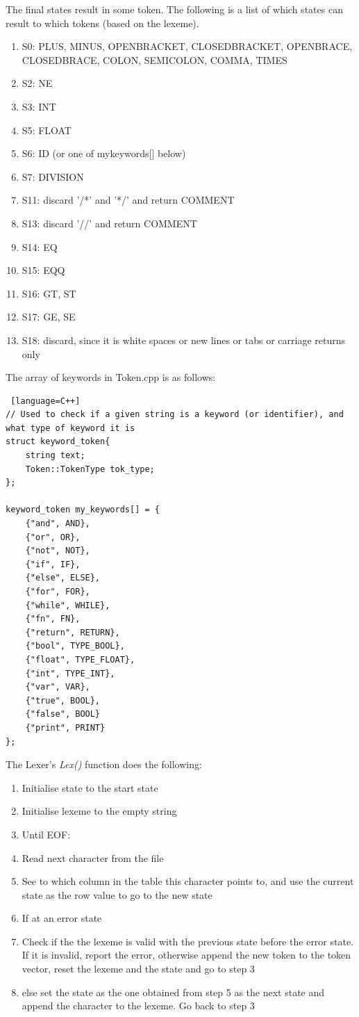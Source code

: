 The final states result in some token. The following is a list of which states can result to which tokens (based on the lexeme).
\begin{enumerate}
	\item S0: PLUS, MINUS, OPEN\textunderscore BRACKET, CLOSED\textunderscore BRACKET, OPEN\textunderscore BRACE, CLOSED\textunderscore BRACE, COLON, SEMI\textunderscore COLON, COMMA, TIMES
	\item S2: NE
	\item S3: INT
	\item S5: FLOAT
	\item S6: ID (or one of mykeywords[] below)
	\item S7: DIVISION
	\item S11: discard '/*' and '*/' and return COMMENT
	\item S13: discard '//' and return COMMENT
	\item S14: EQ
	\item S15: EQQ
	\item S16: GT, ST
	\item S17: GE, SE
	\item S18: discard, since it is white spaces or new lines or tabs or carriage returns only
\end{enumerate}

\bigskip

The array of keywords in Token.cpp is as follows:
\begin{lstlisting} [language=C++]
// Used to check if a given string is a keyword (or identifier), and what type of keyword it is
struct keyword_token{
	string text;
	Token::TokenType tok_type;
};

keyword_token my_keywords[] = {
	{"and", AND},
	{"or", OR},
	{"not", NOT},
	{"if", IF},
	{"else", ELSE},
	{"for", FOR},
	{"while", WHILE},
	{"fn", FN},
	{"return", RETURN},
	{"bool", TYPE_BOOL},
	{"float", TYPE_FLOAT},
	{"int", TYPE_INT},
	{"var", VAR},
	{"true", BOOL},
	{"false", BOOL}
	{"print", PRINT}
};
\end{lstlisting}

The Lexer's \textit{Lex()} function does the following:
\begin{enumerate}
	\item Initialise state to the start state
	\item Initialise lexeme to the empty string
	\item Until EOF:
	\item \quad Read next character from the file
	\item \quad See to which column in the table this character points to, and use the current state as the row value to go to the new state
	\item \quad If at an error state
	\item \quad \quad Check if the the lexeme is valid with the previous state before the error state. If it is invalid, report the error, otherwise append the new token to the token vector, reset the lexeme and the state and go to step 3
	\item \quad else set the state as the one obtained from step 5 as the next state and append the character to the lexeme. Go back to step 3
\end{enumerate}

